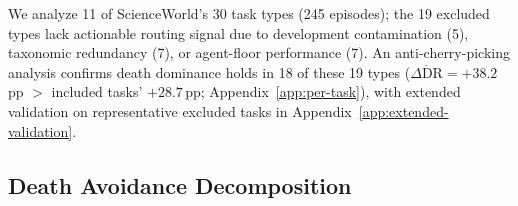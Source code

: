 We analyze 11 of ScienceWorld's 30 task types (245 episodes); the 19 excluded types lack actionable routing signal due to development contamination (5), taxonomic redundancy (7), or agent-floor performance (7). An anti-cherry-picking analysis confirms death dominance holds in 18 of these 19 types ($\overline{\Delta\text{DR}} = +38.2$\,pp $>$ included tasks' $+28.7$\,pp; Appendix~\ref{app:per-task}), with extended validation on representative excluded tasks in Appendix~\ref{app:extended-validation}.

\subsection{Death Avoidance Decomposition}
\label{sec:death-decomp}

\begin{table}[t]
\centering
\scriptsize
\setlength{\tabcolsep}{2.5pt}
\caption{Per-task decomposition. D\%: death rate for internal/deterministic. D/I/N: det-preferred / int-preferred / no-preference labels. $\dagger$\,Only task with zero deaths; $n{=}40$ (two batches).}
\label{tab:per-task}
\end{table}

